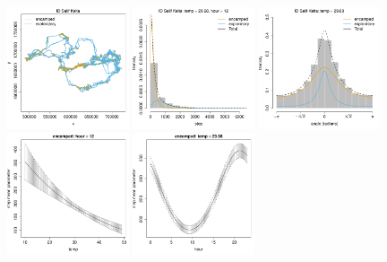 \documentclass[12pt]{article}\usepackage[]{graphicx}\usepackage[]{color}
\begin{document}
\begin{figure}[htbp]
  \centering
  \includegraphics[width=0.32\textwidth]{plot_elephantResults015.pdf}
  \includegraphics[width=0.32\textwidth]{plot_elephantResults009.pdf}
  \includegraphics[width=0.32\textwidth]{plot_elephantResults012.pdf} \\
  \includegraphics[width=0.32\textwidth]{plot_elephantResults001.pdf} 
  \includegraphics[width=0.32\textwidth]{plot_elephantResults002.pdf}

\end{figure}
\end{document}
